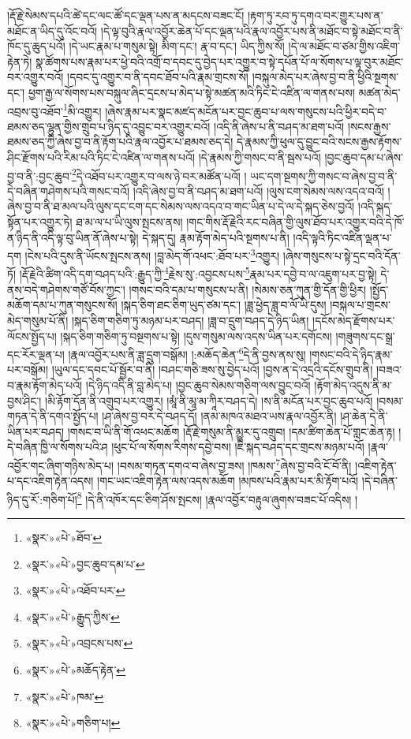 །རྡོ་རྗེ་སེམས་དཔའི་ཚེ་དང་ལང་ཚོ་དང་ལྡན་པས་ན་མདངས་བཟང་ངོ། །རྟག་ཏུ་རབ་ཏུ་དགའ་བར་གྱུར་པས་ན་མཐོང་ན་ཡིད་དུ་འོང་བའོ། །དེ་ལྟ་བུའི་རྣལ་འབྱོར་ཆེན་པོ་དང་ལྡན་པའི་རྣལ་འབྱོར་པས་ནི་མཐོང་བ་སྟེ་མཐོང་བ་ནི་ཁོང་དུ་ཆུད་པའོ། །དེ་ཡང་རྣམ་པ་གསུམ་སྟེ། མིག་དང་། རྣ་བ་དང་། ཡིད་ཀྱིས་སོ། །དེ་ལ་མཐོང་བ་ཙམ་གྱིས་འཇིག་རྟེན་ཏེ། སྣ་ཚོགས་པས་རྣམ་པར་ཕྱེ་བའི་འགྲོ་བ་དབང་དུ་བྱེད་པར་འགྱུར་བ་སྟེ་དཔོན་པོ་ལ་སོགས་པ་ལྟ་བུར་མཐོང་བར་འགྱུར་བའོ། །དབང་དུ་འགྱུར་བ་ནི་དབང་ཐོབ་པའི་རྣམ་གྲངས་སོ། །བསྐུལ་མེད་པར་ཞེས་བྱ་བ་ནི་ཕྱིའི་སྔགས་དང་། ཕྱག་རྒྱ་ལ་སོགས་པས་བསྐུལ་ཞིང་དྲངས་པ་མེད་པ་སྟེ་མཚན་མའི་ཏིང་ངེ་འཛིན་ལ་གནས་པས། མཚན་མེད་འབྲས་བུ་འཐོབ་\footnote{«སྣར་»«པེ་»ཐོབ་}མི་འགྱུར། །ཞེས་རྣམ་པར་སྣང་མཛད་མངོན་པར་བྱང་ཆུབ་པ་ལས་གསུངས་པའི་ཕྱིར་བདེ་བ་ཐམས་ཅད་ལྷུན་གྱིས་གྲུབ་པ་ཉིད་དུ་འབྱུང་བར་འགྱུར་བའོ། །འདི་ནི་ཞེས་པ་ནི་བཤད་མ་ཐག་པའོ། །སངས་རྒྱས་ཐམས་ཅད་ཀྱི་ཞེས་བྱ་བ་ནི་རྟོག་པའི་རྣལ་འབྱོར་པ་ཐམས་ཅད་དེ། དེ་རྣམས་ཀྱི་ཕུལ་དུ་བྱུང་བའི་སངས་རྒྱས་རྟོགས་ཤིང་རྫོགས་པའི་རིམ་པའི་ཏིང་ངེ་འཛིན་ལ་གནས་པའོ། །དེ་རྣམས་ཀྱི་གསང་བ་ནི་སྦས་པའོ། །བྱང་ཆུབ་དམ་པ་ཞེས་བྱ་བ་ནི་:བྱང་ཆུབ་\footnote{«སྣར་»«པེ་»བྱང་ཆུབ་དམ་པ་}དེ་འཐོབ་པར་འགྱུར་བ་ལས་ཉེ་བར་མཚོན་པའོ། །
ཡང་དག་སྔགས་ཀྱི་གསང་བ་ཞེས་བྱ་བ་ནི་དེ་བཞིན་གཤེགས་པའི་གསང་བའོ། །འདི་ཞེས་བྱ་བ་ནི་བཤད་མ་ཐག་པའོ། །ལུས་ངག་སེམས་ལས་འདའ་བའོ། །ཞེས་བྱ་བ་ནི་ཐ་མལ་པའི་ལུས་དང་ངག་དང་སེམས་ལས་འདའ་བ་གང་ཡིན་པ་དེ་ལ་དེ་སྐད་ཅེས་བྱའོ། །འདི་སྐད་སྟོན་པར་འགྱུར་ཏེ། ཐ་མ་ལ་པ་ཡི་ལུས་སྤངས་ནས། །གང་གིས་རྡོ་རྗེའི་རང་བཞིན་གྱི་ལུས་ཐོབ་པར་འགྱུར་བའི་དེ་ཁོ་ན་ཉིད་ནི་འདི་ལྟ་བུ་ཡིན་ནོ་ཞེས་པ་སྟེ། དེ་སྐད་དུ། རྣམ་རྟོག་མེད་པའི་སྔགས་པ་ནི། །འདི་ལྟའི་ཏིང་འཛིན་ལྡན་པ་དག །ངེས་པའི་དུས་ནི་ཡོངས་སྤངས་ནས། །བླ་མེད་གོ་འཕང་:ཐོབ་པར་\footnote{«སྣར་»«པེ་»འཐོབ་པར་}འགྱུར། །ཞེས་གསུངས་པ་སྟེ་དྲང་བའི་དོན་ཏོ། །རྡོ་རྗེའི་ཚིག་འདི་དག་བཤད་པའི་:རྒྱུད་ཀྱི་\footnote{«སྣར་»«པེ་»རྒྱུད་ཀྱིས་}རྗེས་སུ་:འབྱངས་པས་\footnote{«སྣར་»«པེ་»འབྲངས་པས་}རྣམ་པར་དབྱེ་བ་ལ་འཇུག་པར་བྱ་སྟེ། དེ་ནས་བདེ་གཤེགས་གཙོ་བོས་ཀྱང་། །གསང་བའི་དམ་པ་གསུངས་པ་ནི། །སེམས་ཅན་ཀུན་གྱི་དོན་གྱི་ཕྱིར། །སྤྱོད་མཆོག་དམ་པ་ཀུན་གསུངས་སོ། །སྐད་ཅིག་ཐང་ཅིག་ཡུད་ཙམ་དང་། །ཟླ་ཕྱེད་ཟླ་བ་ལོ་ཡི་དུས། །བསྐལ་པ་གྲངས་མེད་གསུམ་པོ་ནི། །སྐད་ཅིག་གཅིག་ཏུ་མཉམ་པར་བཤད། །ཟླ་བ་དྲུག་བཤད་དེ་ཉིད་ཡིན། །དངོས་མེད་རྫོགས་པར་ལོངས་སྤྱོད་པ། །སྐད་ཅིག་གཅིག་ཏུ་བསྔགས་པ་སྟེ། །དུས་གསུམ་ལས་འདས་ཡིན་པར་དགོངས། །གཟུགས་དང་སྒྲ་དང་རོར་ལྡན་པ། །རྣལ་འབྱོར་པས་ནི་ཟླ་དྲུག་བསྒོམ། །:མཆོད་ཆེན་\footnote{«སྣར་»«པེ་»མཆོད་རྟེན་}དེ་ནི་བྱས་ནས་སུ། །གསང་བའི་དེ་ཉིད་རྣམ་པར་བསྒོམ། །ཡུལ་དང་དབང་པོ་སྦྱོར་བ་ནི། །བཤང་གཅི་ཟས་སུ་བྱེད་པའོ། །བྱས་ན་དེ་འདྲའི་དངོས་གྲུབ་ནི། །བཟའ་བ་རྣམ་རྟོག་མེད་པའོ། །དེ་ཉིད་འདི་ནི་བླ་མེད་པ། །བྱང་ཆུབ་སེམས་གཅིག་ལས་བྱུང་བའོ། །རྟོག་མེད་འདུས་ནི་མ་བྱས་ཤིང་། །མི་རྟོག་དོན་ནི་འགྲུབ་པར་འགྱུར། །མཱཾ་ནི་མཱ་མ་ཀཱིར་བཤད་དེ། །ས་ནི་མངོན་པར་བྱང་ཆུབ་པའོ། །བསམ་གཏན་དེ་ནི་དགའ་སྤྱོད་པ། །ཤ་ཞེས་བྱ་བར་དེ་བཤད་དོ། །ནམ་མཁའ་མཐའ་ཡས་རྣལ་འབྱོར་ནི། །ཤ་ཆེན་དེ་ནི་ཡིན་པར་བཤད། །གསང་བ་ཡི་ནི་གོ་འཕང་མཆོག །རྡོ་རྗེ་གསུམ་ནི་མྱུར་དུ་འགྲུབ། །དམ་ཚིག་ཆེན་པོ་གླང་ཆེན་རྟ། །དེ་བཞིན་ཁྱི་ལ་སོགས་པའི་ཤ །ཕུང་པོ་ལ་སོགས་རིགས་དབྱེ་བས། །ཇི་སྐད་བཤད་དང་གྲངས་མཉམ་པའོ། །རྣལ་འབྱོར་གང་ཞིག་གཉིས་མེད་པ། །བསམ་གཏན་དགའ་བ་ཞེས་བྱ་ཟས། །ཁམས་\footnote{«སྣར་»«པེ་»ཁམ་}ཞེས་བྱ་བའི་ངོ་བོ་ནི། །འཇིག་རྟེན་པ་དང་འཇིག་རྟེན་འདས། །གང་ཡང་འཇིག་རྟེན་ལས་འདས་མཆོག །མཁས་པའི་རྣམ་པར་མི་རྟོག་པའོ། །དེ་བཞིན་ཉིད་དུ་རོ་:གཅིག་པོ།\footnote{«སྣར་»«པེ་»གཅིག་པ།} །དེ་ནི་འཁོར་དང་ཅིག་ཤོས་སྤངས། །རྣལ་འབྱོར་བརྟུལ་ཞུགས་བཟང་པོ་འདིས། །

